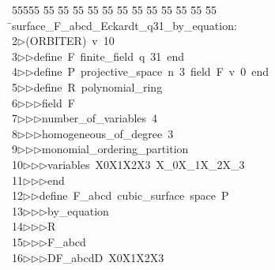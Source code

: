 %
%
\begin{tabbing}
55555 \= 55 \= 55 \= 55 \= 55 \= 55 \= 55 \= 55 \= 55 \= 55 \= 55 \= 55 \= 55 \= \>surface\_F\_abcd\_Eckardt\_q31\_by\_equation:\\[0pt]
2\>$\triangleright$\>(ORBITER)\ v\ 10\ \\[0pt]
3\>$\triangleright$\>$\triangleright$\>define\ F\ finite\_field\ q\ 31\ end\ \\[0pt]
4\>$\triangleright$\>$\triangleright$\>define\ P\ projective\_space\ n\ 3\ field\ F\ v\ 0\ end\ \\[0pt]
5\>$\triangleright$\>$\triangleright$\>define\ R\ polynomial\_ring\ \\[0pt]
6\>$\triangleright$\>$\triangleright$\>$\triangleright$\>field\ F\ \\[0pt]
7\>$\triangleright$\>$\triangleright$\>$\triangleright$\>number\_of\_variables\ 4\ \\[0pt]
8\>$\triangleright$\>$\triangleright$\>$\triangleright$\>homogeneous\_of\_degree\ 3\ \\[0pt]
9\>$\triangleright$\>$\triangleright$\>$\triangleright$\>monomial\_ordering\_partition\ \\[0pt]
10\>$\triangleright$\>$\triangleright$\>$\triangleright$\>variables\ X0X1X2X3\ X\_0X\_1X\_2X\_3\ \\[0pt]
11\>$\triangleright$\>$\triangleright$\>$\triangleright$\>end\ \\[0pt]
12\>$\triangleright$\>$\triangleright$\>define\ F\_abcd\ cubic\_surface\ space\ P\ \\[0pt]
13\>$\triangleright$\>$\triangleright$\>$\triangleright$\>by\_equation\ \\[0pt]
14\>$\triangleright$\>$\triangleright$\>$\triangleright$\>R\ \\[0pt]
15\>$\triangleright$\>$\triangleright$\>$\triangleright$\>F\_abcd\ \\[0pt]
16\>$\triangleright$\>$\triangleright$\>$\triangleright$\>DF\_abcdD\ X0X1X2X3\ \\[0pt]

\end{tabbing}
